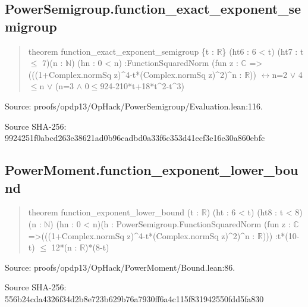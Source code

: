 \documentclass[11pt,a4paper]{article}
\begin{document}
\begin{samepage}
\subsection{PowerSemigroup.function\_exact\_exponent\_semigroup}
\begin{quote}\small\ttfamily theorem function\_exact\_exponent\_semigroup \{t : \ensuremath{\mathbb{R}}\} (ht6 : 6 < t) (ht7 : t \ensuremath{\leq} 7)\newline     (n : \ensuremath{\mathbb{N}}) (hn : 0 < n) :\newline     FunctionSquaredNorm (fun z : \ensuremath{\mathbb{C}} =>\newline       (((1+Complex.normSq z)\textasciicircum{}4-t*(Complex.normSq z)\textasciicircum{}2)\textasciicircum{}n : \ensuremath{\mathbb{R}})) \ensuremath{\leftrightarrow}\newline       n=2 \ensuremath{\vee} 4\ensuremath{\leq}n \ensuremath{\vee} (n=3 \ensuremath{\wedge} 0\ensuremath{\leq}924-210*t+18*t\textasciicircum{}2-t\textasciicircum{}3)\end{quote}
{\small Source: proofs/opdp13/OpHack/PowerSemigroup/Evaluation.lean:116.\par}

{\small Source SHA-256: 9924251f0abcd263e38621ad0b96cadbd0a33f6c353d41ecf3e16e30a860ebfc\par}

\end{samepage}
\begin{samepage}
\subsection{PowerMoment.function\_exponent\_lower\_bound}
\begin{quote}\small\ttfamily theorem function\_exponent\_lower\_bound (t : \ensuremath{\mathbb{R}}) (ht : 6 < t) (ht8 : t < 8)\newline     (n : \ensuremath{\mathbb{N}}) (hn : 0 < n)\newline     (h : PowerSemigroup.FunctionSquaredNorm (fun z : \ensuremath{\mathbb{C}} =>\newline       (((1+Complex.normSq z)\textasciicircum{}4-t*(Complex.normSq z)\textasciicircum{}2)\textasciicircum{}n : \ensuremath{\mathbb{R}}))) :\newline     t*(10-t) \ensuremath{\leq} 12*(n : \ensuremath{\mathbb{R}})*(8-t)\end{quote}
{\small Source: proofs/opdp13/OpHack/PowerMoment/Bound.lean:86.\par}

{\small Source SHA-256: 556b24cda4326f34d2b8e723b629b76a7930ff6a4c115f831942550fdd5fa830\par}

\end{samepage}
\end{document}
